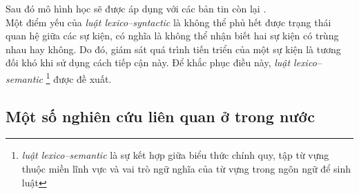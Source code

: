 Sau đó mô hình học sẽ được áp dụng với các bản tin còn lại \cite{FHH06}. \\
\noindent Một điểm yếu của \emph{luật lexico--syntactic} là không thể phủ hết được trạng thái quan hệ giữa các sự kiện, có nghĩa là không thể nhận biết hai sự kiện có trùng nhau hay không. Do đó, giám sát quá trình tiến triển của một sự kiện là tương đối khó khi sử dụng cách tiếp cận này. Để khắc phục điều này, \emph{luật lexico--semantic} \footnote{\emph{luật lexico--semantic} là sự kết hợp giữa biểu thức chính quy, tập từ vựng thuộc miền lĩnh vực và vai trò ngữ nghĩa của từ vựng trong ngôn ngữ để sinh luật} được đề xuất. 



	\subsection{Một số nghiên cứu liên quan ở trong nước}

